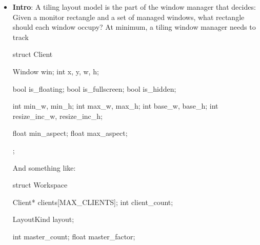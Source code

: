 \documentclass{report}
\begin{document}
    \pagebreak 
    \begin{itemize}
        \item \textbf{Intro}: A tiling layout model is the part of the window manager that decides: Given a monitor rectangle and a set of managed windows, what rectangle should each window occupy?
            \bigbreak \noindent 
            At minimum, a tiling window manager needs to track
            \bigbreak \noindent 
            \begin{cppcode}
                struct Client {
                    Window win;
                    int x, y, w, h;

                    bool is_floating;
                    bool is_fullscreen;
                    bool is_hidden;

                    int min_w, min_h;
                    int max_w, max_h;
                    int base_w, base_h;
                    int resize_inc_w, resize_inc_h;

                    float min_aspect;
                    float max_aspect;
                };
            \end{cppcode}
            \bigbreak \noindent 
            And something like:
            \bigbreak \noindent 
            \begin{cppcode}
                struct Workspace {
                    Client* clients[MAX_CLIENTS];
                    int client_count;

                    LayoutKind layout;

                    int master_count;
                    float master_factor;

}
\end{cppcode}
\end{itemize}
\end{document}
